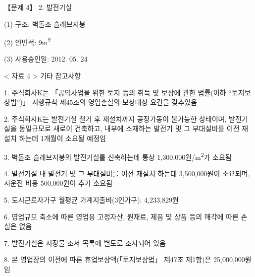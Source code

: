 \begin{longquestion}{【문제 4】}
2. 발전기실 \par
\medskip\noindent (1) 구조: 벽돌조 슬래브지붕 \par
\medskip\noindent (2) 연면적: 9m\textsuperscript{2} \par
\medskip\noindent (3) 사용승인일: 2012. 05. 24 \par
< 자료 4 > 기타 참고사항 \par
1. 주식회사K는 「공익사업을 위한 토지 등의 취득 및 보상에 관한 법률(이하 “토지보상법”)」 시행규칙 제45조의 영업손실의 보상대상 요건을 갖추었음 \par
2. 주식회사K는 발전기실 철거 후 재설치까지 공장가동이 불가능한 상태이며, 발전기실을 동일규모로 새로이 건축하고, 내부에 소재하는 발전기 및 그 부대설비를 이전 재설치 하는데 1개월이 소요될 예정임 \par
3. 벽돌조 슬래브지붕의 발전기실를 신축하는데 통상 1,300,000원/m\textsuperscript{2}가 소요됨 \par
4. 발전기실 내 발전기 및 그 부대설비를 이전 재설치 하는데 3,500,000원이 소요되며, 시운전 비용 500,000원이 추가 소요됨 \par
5. 도시근로자가구 월평균 가계지출비(3인가구): 4,233,829원 \par
6. 영업규모 축소에 따른 영업용 고정자산, 원재료, 제품 및 상품 등의 매각에 따른 손실은 없음 \par
7. 발전기실은 지장물 조서 목록에 별도로 조사되어 있음 \par
8. 본 영업장의 이전에 따른 휴업보상액(「토지보상법」 제47조 제1항)은 25,000,000원 임 \par
\end{longquestion}
